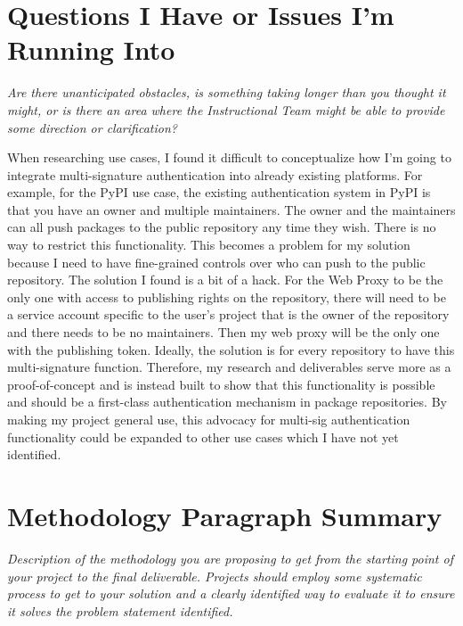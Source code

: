 \documentclass[12pt]{article}
\newcommand{\instruction}[1]{{\small\itshape #1}}
\begin{document}
\section*{Questions I Have or Issues I'm Running Into}

\instruction{Are there unanticipated obstacles, is something taking longer than you thought it might, or is there an area where the Instructional Team might be able to provide some direction or clarification?}

When researching use cases, I found it difficult to conceptualize how I'm going to integrate multi-signature authentication into already existing platforms. For example, for the PyPI use case, the existing authentication system in PyPI is that you have an owner and multiple maintainers. The owner and the maintainers can all push packages to the public repository any time they wish. There is no way to restrict this functionality. This becomes a problem for my solution because I need to have fine-grained controls over who can push to the public repository. The solution I found is a bit of a hack. For the Web Proxy to be the only one with access to publishing rights on the repository, there will need to be a service account specific to the user's project that is the owner of the repository and there needs to be no maintainers. Then my web proxy will be the only one with the publishing token. Ideally, the solution is for every repository to have this multi-signature function. Therefore, my research and deliverables serve more as a proof-of-concept and is instead built to show that this functionality is possible and should be a first-class authentication mechanism in package repositories. By making my project general use, this advocacy for multi-sig authentication functionality could be expanded to other use cases which I have not yet identified.

\section*{Methodology Paragraph Summary}

\instruction{Description of the methodology you are proposing to get from the starting point of your project to the final deliverable. Projects should employ some systematic process to get to your solution and a clearly identified way to evaluate it to ensure it solves the problem statement identified.}
\end{document}
